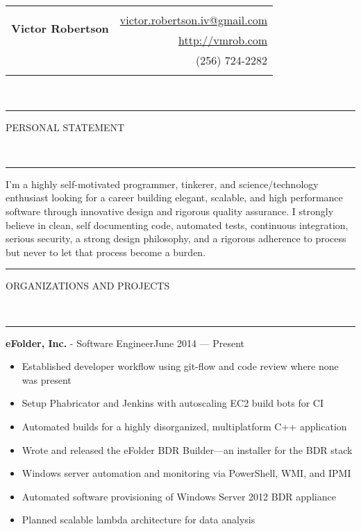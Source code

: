 \documentclass[10pt, letterpaper, oneside]{article}
\makeatletter
\newcommand{\name}{Victor Robertson}
\newcommand{\website}{\href{http://vmrob.com}{http://vmrob.com}}
\newcommand{\phone}{(256) 724-2282}
\newcommand{\email}{\href{mailto:victor.robertson.iv@gmail.com}{victor.robertson.iv@gmail.com}}
\newcommand{\HRule}[2]{\textcolor{#1}{\rule{\linewidth}{#2}}}
\newcommand{\sectiontitle}[1]{\begin{minipage}{\textwidth}\HRule{black}{0.25mm}\vspace{-10pt}\begin{center}\Large\MakeUppercase{#1}\end{center}\end{minipage}\\\HRule{light-grey}{0.15mm}\vspace{\baselineskip}}
\newenvironment{ressection}[1]{
  \sectiontitle{#1}}
  {\vspace{0.5\baselineskip}}
\newcommand{\resitem}[1]{
    \vspace{2pt}
    \item \begin{flushleft} #1 \end{flushleft}
}
\newcommand{\resentryheader}[3]{
    \vspace{-5pt}
    \textbf{#1} - #2\hspace{\stretch{1}}\textcolor{light-grey}{#3}\\
}
\newenvironment{resentry}[3]{
  \begin{minipage}{\textwidth}
    \resentryheader{#1}{#2}{#3}
        \vspace{-\baselineskip}
    \begin{itemize}[noitemsep,nolistsep]
}{
    \end{itemize}
        \vspace{\baselineskip}
        \end{minipage}
}
\makeatother
\begin{document}
\begin{tabularx}{\linewidth}{X r}
\multirow{3}{*}{\Huge\textbf{\name}} & \\& \email \\& \website \\& \phone \\\\
\end{tabularx}\\

\begin{ressection}{Personal Statement}
    I'm a highly self-motivated programmer, tinkerer, and science/technology enthusiast looking for a career building elegant, scalable, and high performance software through innovative design and rigorous quality assurance. I strongly believe in clean, self documenting code, automated tests, continuous integration, serious security, a strong design philosophy, and a rigorous adherence to process but never to let that process become a burden.\\
\end{ressection}

\begin{ressection}{Organizations and Projects}
  \begin{resentry}{eFolder, Inc.}{Software Engineer}{June 2014 --- Present}
    \resitem{Established developer workflow using git-flow and code review where none was present}
    \resitem{Setup Phabricator and Jenkins with autoscaling EC2 build bots for CI}
    \resitem{Automated builds for a highly disorganized, multiplatform C++ application}
    \resitem{Wrote and released the eFolder BDR Builder---an installer for the BDR stack}
    \resitem{Windows server automation and monitoring via PowerShell, WMI, and IPMI}
    \resitem{Automated software provisioning of Windows Server 2012 BDR appliance}
    \resitem{Planned scalable lambda architecture for data analysis}
  \end{resentry}
\end{ressection}
\end{document}
